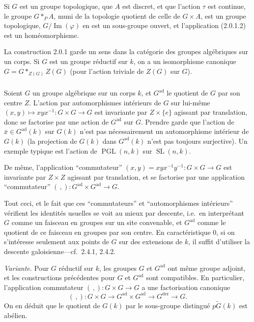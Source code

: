 \documentclass[12pt,a4paper]{article}
\theoremstyle{plain}
\theoremstyle{definition}
\theoremstyle{remark}
\DeclareMathOperator{\SL}{SL}
\DeclareMathOperator{\PGL}{PGL}
\DeclareMathOperator{\Image}{Im}
\begin{document}
Si $G$ est un groupe topologique, que $A$ est discret, et que l'action $\tau$ est continue, le groupe $G *_P A$, muni de la topologie quotient de celle de $G \times A$, est un groupe topologique, $G/\Image(\varphi)$ en est un sous-groupe ouvert, et l'application (2.0.1.2) est un hom\'eomorphisme.

La construction 2.0.1 garde un sens dans la cat\'egorie des groupes alg\'ebriques sur un corps. Si $G$ est un groupe r\'eductif sur $k$, on a un isomorphisme canonique $G = G *_{Z(G)} Z(G)$ (pour l'action triviale de $Z(G)$ sur $G$).

\subsubsection{}

Soient $G$ un groupe alg\'ebrique sur un corps $k$, et $G^{\text{ad}}$ le quotient de $G$ par son centre $Z$. L'action par automorphismes int\'erieurs de $G$ sur lui-m\^eme $(x,y) \mapsto xyx^{-1}: G \times G \to G$ est invariante par $Z \times \{e\}$ agissant par translation, donc se factorise par une action de $G^{\text{ad}}$ sur $G$. Prendre garde que l'action de $\bar{x} \in G^{\text{ad}}(k)$ sur $G(k)$ n'est pas n\'ecessairement un automorphisme int\'erieur de $G(k)$ (la projection de $G(k)$ dans $G^{\text{ad}}(k)$ n'est pas toujours surjective). Un exemple typique est l'action de $\PGL(n,k)$ sur $\SL(n,k)$.

De m\^eme, l'application ``commutateur'' $(x,y) = xyx^{-1}y^{-1}: G \times G \to G$ est invariante par $Z \times Z$ agissant par translation, et se factorise par une application ``commutateur'' $(\,,): G^{\text{ad}} \times G^{\text{ad}} \to G$.

Tout ceci, et le fait que ces ``commutateurs'' et ``automorphismes int\'erieurs'' v\'erifient les identit\'es usuelles se voit au mieux par descente, i.e.~en interpr\'etant $G$ comme un faisceau en groupes sur un site convenable, et $G^{\text{ad}}$ comme le quotient de ce faisceau en groupes par son centre. En caract\'eristique 0, si on s'int\'eresse seulement aux points de $G$ sur des extensions de $k$, il suffit d'utiliser la descente galoisienne---cf.~2.4.1, 2.4.2.

\textit{Variante.} Pour $G$ r\'eductif sur $k$, les groupes $G$ et $G^{\text{ad}}$ ont m\^eme groupe adjoint, et les constructions pr\'ec\'edentes pour $G$ et $G^{\text{ad}}$ sont compatibles. En particulier, l'application commutateur $(\,,): G \times G \to G$ a une factorisation canonique
\[
(\,,): G \times G \xrightarrow{\;\;} G^{\text{ad}} \times G^{\text{ad}} \xrightarrow{\;\;} G^{\text{der}} \xrightarrow{\;\;} G.
\]
On en d\'eduit que le quotient de $G(k)$ par le sous-groupe distingu\'e $p\tilde{G}(k)$ est ab\'elien.
\end{document}
